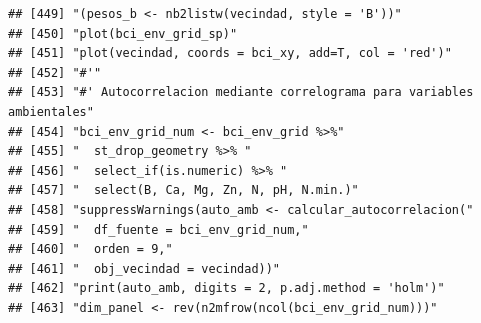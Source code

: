 \documentclass[11pt,]{article}
\begin{document}
\begin{verbatim}
## [449] "(pesos_b <- nb2listw(vecindad, style = 'B'))"                                                                                                                          
## [450] "plot(bci_env_grid_sp)"                                                                                                                                                 
## [451] "plot(vecindad, coords = bci_xy, add=T, col = 'red')"                                                                                                                   
## [452] "#'"                                                                                                                                                                    
## [453] "#' Autocorrelacion mediante correlograma para variables ambientales"                                                                                                   
## [454] "bci_env_grid_num <- bci_env_grid %>%"                                                                                                                                  
## [455] "  st_drop_geometry %>% "                                                                                                                                               
## [456] "  select_if(is.numeric) %>% "                                                                                                                                          
## [457] "  select(B, Ca, Mg, Zn, N, pH, N.min.)"                                                                                                                                
## [458] "suppressWarnings(auto_amb <- calcular_autocorrelacion("                                                                                                                
## [459] "  df_fuente = bci_env_grid_num,"                                                                                                                                       
## [460] "  orden = 9,"                                                                                                                                                          
## [461] "  obj_vecindad = vecindad))"                                                                                                                                           
## [462] "print(auto_amb, digits = 2, p.adj.method = 'holm')"                                                                                                                    
## [463] "dim_panel <- rev(n2mfrow(ncol(bci_env_grid_num)))"                                                                                                                     

\end{verbatim}
\end{document}
